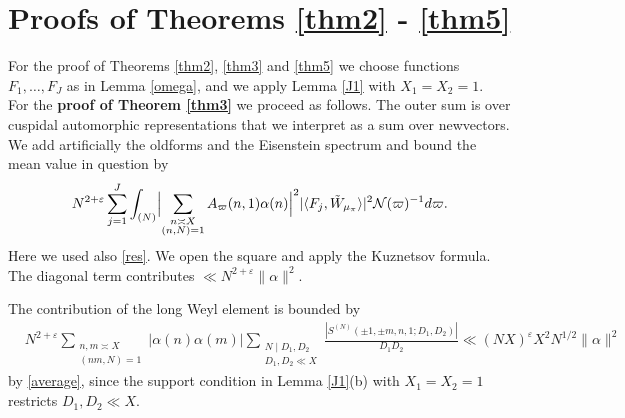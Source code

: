 \documentclass[11pt]{amsart}
\theoremstyle{plain}
\numberwithin{equation}{section}
\theoremstyle{definition}
\begin{document}

   
\section{Proofs of Theorems \ref{thm2} - \ref{thm5}} 

For the proof of Theorems \ref{thm2}, \ref{thm3} and \ref{thm5} we choose functions $F_1, \ldots, F_J$ as in Lemma \ref{omega}, and we apply Lemma \ref{J1} with $X_1 = X_2 = 1$. \\ 

For the \textbf{proof of Theorem \ref{thm3}} we proceed as follows. The outer sum is over cuspidal automorphic representations that we interpret as a sum over newvectors. We add artificially the oldforms and the Eisenstein spectrum and bound the mean value in question by
$$ N^{2+\varepsilon}  \sum_{j=1}^J \int_{(N)}  \Bigl|\sum_{\substack{n \asymp X \\ (n, N) = 1}} A_{\varpi}(n, 1) \alpha(n)\Bigr|^2 |\langle F_j, \tilde{W}_{\mu_{\pi} }\rangle|^2  \mathcal{N}(\varpi)^{-1} d\varpi.$$
Here we used also \eqref{res}.  We open the square and apply the Kuznetsov formula. The diagonal term contributes $\ll N^{2+\varepsilon} \| \alpha \|^2$. 
   
 The contribution of the long Weyl element is bounded by
\begin{displaymath}
\begin{split}
&N^{2+\varepsilon} \sum_{\substack{n, m \asymp X\\ (nm, N) = 1}}|\alpha(n)\alpha(m)| \sum_{\substack{ N \mid D_1, D_2\\ D_1, D_2 \ll X}} \frac{|S^{(N)}(\pm 1,  \pm m,  n,  1; D_1, D_2)|}{D_1D_2}   \ll (NX)^{\varepsilon}X^2N^{1/2}\| \alpha \|^2
\end{split}
\end{displaymath}
 by \eqref{average}, since the support condition in Lemma \ref{J1}(b) with $X_1 = X_2 = 1$ restricts $D_1, D_2 \ll X$.     
    
\end{document}
